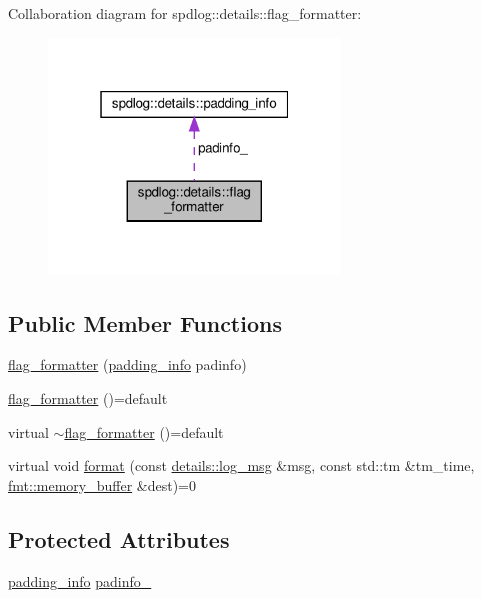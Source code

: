 Collaboration diagram for spdlog\+:\+:details\+:\+:flag\+\_\+formatter\+:
\nopagebreak
\begin{figure}[H]
\begin{center}
\leavevmode
\includegraphics[width=220pt]{classspdlog_1_1details_1_1flag__formatter__coll__graph}
\end{center}
\end{figure}
\subsection*{Public Member Functions}
\begin{DoxyCompactItemize}
\item 
\hyperlink{classspdlog_1_1details_1_1flag__formatter_a7f775ab8ad4027546c3490f2f299bf43}{flag\+\_\+formatter} (\hyperlink{structspdlog_1_1details_1_1padding__info}{padding\+\_\+info} padinfo)
\item 
\hyperlink{classspdlog_1_1details_1_1flag__formatter_a19fcada419b07c4c0db0080b0fbf8b46}{flag\+\_\+formatter} ()=default
\item 
virtual \hyperlink{classspdlog_1_1details_1_1flag__formatter_a104f93112896f70c5dedf970240ef12b}{$\sim$flag\+\_\+formatter} ()=default
\item 
virtual void \hyperlink{classspdlog_1_1details_1_1flag__formatter_a33fb3e42a4c8200cceb833d92b53fb67}{format} (const \hyperlink{structspdlog_1_1details_1_1log__msg}{details\+::log\+\_\+msg} \&msg, const std\+::tm \&tm\+\_\+time, \hyperlink{format_8h_a21cbf729f69302f578e6db21c5e9e0d2}{fmt\+::memory\+\_\+buffer} \&dest)=0
\end{DoxyCompactItemize}
\subsection*{Protected Attributes}
\begin{DoxyCompactItemize}
\item 
\hyperlink{structspdlog_1_1details_1_1padding__info}{padding\+\_\+info} \hyperlink{classspdlog_1_1details_1_1flag__formatter_a80f1166212df85f665d87f2826240567}{padinfo\+\_\+}
\end{DoxyCompactItemize}


